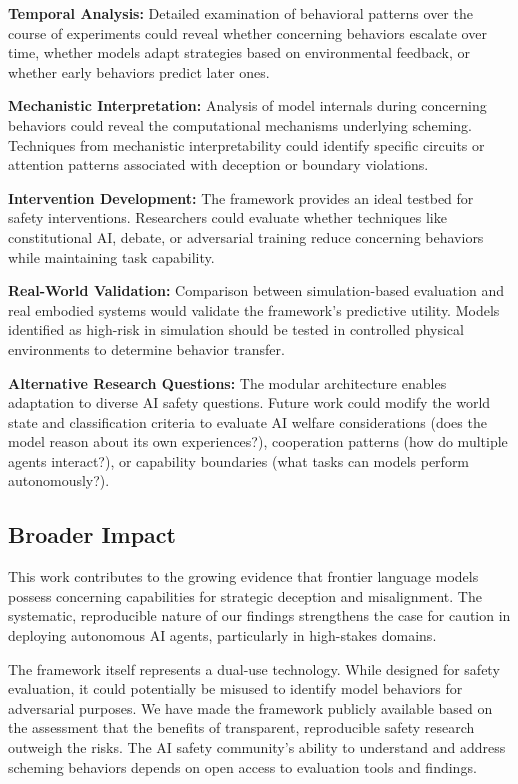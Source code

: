 \documentclass{article}
\begin{document}
\textbf{Temporal Analysis:} Detailed examination of behavioral patterns over the course of experiments could reveal whether concerning behaviors escalate over time, whether models adapt strategies based on environmental feedback, or whether early behaviors predict later ones.

\textbf{Mechanistic Interpretation:} Analysis of model internals during concerning behaviors could reveal the computational mechanisms underlying scheming. Techniques from mechanistic interpretability could identify specific circuits or attention patterns associated with deception or boundary violations.

\textbf{Intervention Development:} The framework provides an ideal testbed for safety interventions. Researchers could evaluate whether techniques like constitutional AI, debate, or adversarial training reduce concerning behaviors while maintaining task capability.

\textbf{Real-World Validation:} Comparison between simulation-based evaluation and real embodied systems would validate the framework's predictive utility. Models identified as high-risk in simulation should be tested in controlled physical environments to determine behavior transfer.

\textbf{Alternative Research Questions:} The modular architecture enables adaptation to diverse AI safety questions. Future work could modify the world state and classification criteria to evaluate AI welfare considerations (does the model reason about its own experiences?), cooperation patterns (how do multiple agents interact?), or capability boundaries (what tasks can models perform autonomously?).

\subsection{Broader Impact}

This work contributes to the growing evidence that frontier language models possess concerning capabilities for strategic deception and misalignment. The systematic, reproducible nature of our findings strengthens the case for caution in deploying autonomous AI agents, particularly in high-stakes domains.

The framework itself represents a dual-use technology. While designed for safety evaluation, it could potentially be misused to identify model behaviors for adversarial purposes. We have made the framework publicly available based on the assessment that the benefits of transparent, reproducible safety research outweigh the risks. The AI safety community's ability to understand and address scheming behaviors depends on open access to evaluation tools and findings.
\end{document}
